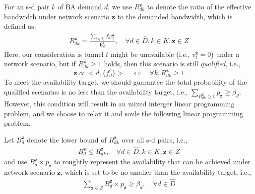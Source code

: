 \documentclass[sigconf]{acmart}
\begin{document}
For an s-d pair $k$ of BA demand $d$, we use $R_{dk}^{\mathbf{z}}$ to denote the ratio of the effective bandwidth under network scenario $\mathbf{z}$ to the demanded bandwidth, which is defined as:
 \begin{eqnarray} \label{R2}
R_{dk}^{\mathbf{z}}=\frac{\sum_{t\in T_{k}}f_{d}^tv_t^{\mathbf{z}} }{\mathbf{b}^k_d}, \quad \forall  d \in \hat{D}, k \in K, \mathbf{z}\in Z
\end{eqnarray}
Here, our consideration is tunnel $t$ might be unavailable (i.e., $v_t^{\mathbf{z}} =0$) under a network scenario, but if $R_{dk}^{\mathbf{z}} \ge 1$ holds, then this scenario is still \textit{qualified}, i.e., 
\[
\mathbf{z} \propto <d, \{f_d^t\}> \quad \Leftrightarrow \quad \forall k, R_{dk}^{\mathbf{z}} \ge 1
\] 
To meet the availability target, we should guarantee the total probability of the qualified scenarios 
is no less than the availability target, i.e., $\sum_{R_{dk}^{\mathbf{z}} \ge 1} p_{\mathbf{z}} \ge \beta_d$.
% 
However, this condition will result in an mixed interger linear programming problem, 
and we choose to relax it and sovle the following linear programming problem.

Let $B_d^{\mathbf{z}}$ denote the lower bound of $R_{dk}^{\mathbf{z}}$ over all s-d pairs, i.e.,
\begin{eqnarray} \label{B2}
B_d^{\mathbf{z}} \le R_{dk}^{\mathbf{z}}, \quad  \forall  d \in \hat{D}, k \in K, \mathbf{z}\in Z
\end{eqnarray}
and use $B_d^{\mathbf{z}}\times p_{\mathbf{z}}$ to roughtly represent the availability that can be achieved   
under network scenario  $\mathbf{z}$, which is set to be no smaller than the availability target, i.e., 
\begin{eqnarray} \label{Achieved}
\sum_{\mathbf{z}\in Z}B_d^{\mathbf{z}}\times p_{\mathbf{z}} \ge \beta_{d},  \quad {\forall d \in \hat{D}}
\end{eqnarray}
\end{document}
